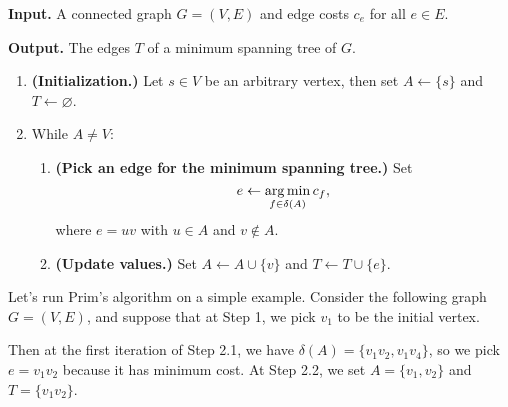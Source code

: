 \begin{mdframed}[
    linewidth=1pt,
    linecolor=black,
    bottomline=false,topline=false,rightline=false,
    innerrightmargin=0pt,innertopmargin=0pt,innerbottommargin=0pt,
    innerleftmargin=1em,%
    skipabove=0.75\baselineskip
]
{\bf Input.} A connected graph $G = (V, E)$ and edge costs $c_e$ for 
all $e \in E$. 

{\bf Output.} The edges $T$ of a minimum spanning tree of $G$.
\begin{enumerate}[leftmargin=1.75cm, label={Step \arabic*.}]
    \item {\bf (Initialization.)} Let $s \in V$ be an arbitrary vertex, 
    then set $A \gets \{s\}$ and $T \gets \varnothing$.

    \item While $A \neq V$:
    \begin{enumerate}[label={Step 2.\arabic*.}]
        \item {\bf (Pick an edge for the minimum spanning tree.)} 
        Set 
        \[ e \gets \operatorname*{arg\,min}_{f \in \delta(A)} c_f, \] 
        where $e = uv$ with $u \in A$ and $v \notin A$.  
        \item {\bf (Update values.)} Set $A \gets A \cup \{v\}$ and 
        $T \gets T \cup \{e\}$. 
    \end{enumerate}
\end{enumerate}
\end{mdframed}\vspace{-0.15cm}

Let's run Prim's algorithm on a simple example. Consider the following 
graph $G = (V, E)$, and suppose that at Step 1, we pick $v_1$ to be 
the initial vertex. 
\begin{center}
\end{center}
\vspace{-0.25cm}
Then at the first iteration of Step 2.1, we have $\delta(A) = 
\{v_1v_2, v_1v_4\}$, so we pick $e = v_1v_2$ because it has minimum cost.
At Step 2.2, we set $A = \{v_1, v_2\}$ and $T = \{v_1v_2\}$. 

